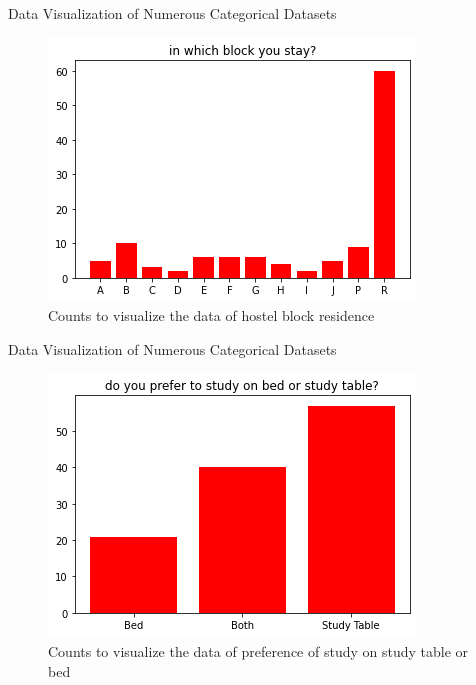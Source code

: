 \documentclass{beamer}
\begin{document}
\begin{frame}
\begin{block}{Data Visualization of Numerous Categorical Datasets}
\begin{figure}[hbtp]
\caption{Counts to visualize the data of hostel block residence}
\centering
\includegraphics[scale=0.60]{block.png}
\end{figure}
\end{block}
\end{frame}

\begin{frame}
\begin{block}{Data Visualization of Numerous Categorical Datasets}
\begin{figure}[hbtp]
\caption{Counts to visualize the data of preference of study on study table or bed}
\centering
\includegraphics[scale=0.60]{bedtable.png}
\end{figure}
\end{block}
\end{frame}
\end{document}
